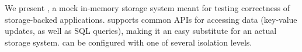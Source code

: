 
We present \tool{}, a mock in-memory storage system meant for testing
correctness of storage-backed applications. 
\tool{} supports 
common APIs for accessing data (key-value updates, as well as SQL queries),
making it an easy substitute for an actual storage system. \tool{}
can be configured with one of several isolation levels. 

